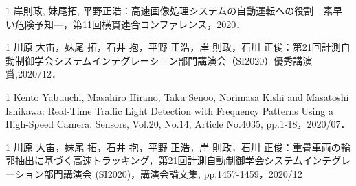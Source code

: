 \begin{招待講演}{1}
岸則政, 妹尾拓, 平野正浩：高速画像処理システムの自動運転への役割—素早い危険予知—，第11回横貫連合コンファレンス，2020．

\end{招待講演}

\begin{受賞}{1}
川原 大宙，妹尾 拓，石井 抱，平野 正浩，岸 則政，石川 正俊：第21回計測自動制御学会システムインテグレーション部門講演会（SI2020）優秀講演賞,2020/12．

\end{受賞}


\begin{査読付}{1}
Kento Yabuuchi, Masahiro Hirano, Taku Senoo, Norimasa Kishi and Masatoshi Ishikawa: Real-Time Traffic Light Detection with Frequency Patterns Using a High-Speed Camera, Sensors, Vol.20, No.14, Article No.4035, pp.1-18，2020/07．

\end{査読付}


\begin{発表}{1}
川原 大宙，妹尾 拓，石井 抱，平野 正浩，岸 則政，石川 正俊：重畳車両の輪郭抽出に基づく高速トラッキング，第21回計測自動制御学会システムインテグレーション部門講演会 (SI2020)，講演会論文集, pp.1457-1459，2020/12

\end{発表}